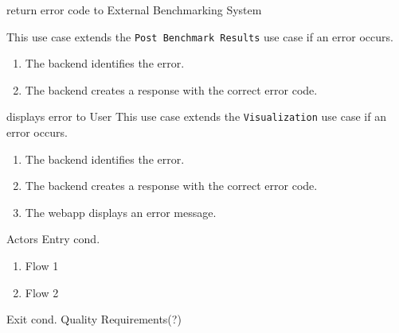 \bigskip

{return error code to External Benchmarking System}
{}
{This use case extends the \texttt{Post Benchmark Results} use case if an error occurs.
\begin{enumerate}
    \item The backend identifies the error.
    \item The backend creates a response with the correct error code.
\end{enumerate}}
{}
{}

\bigskip

{displays error to User}
{This use case extends the \texttt{Visualization} use case if an error occurs.}
{\begin{enumerate}
    \item The backend identifies the error.
    \item The backend creates a response with the correct error code.
    \item The webapp displays an error message.
\end{enumerate}}
{}
{}

\bigskip

{Actors}
{Entry cond.}
{\begin{enumerate}
    \item Flow 1
    \item Flow 2
\end{enumerate}} 
{Exit cond.}
{Quality Requirements(?)}

